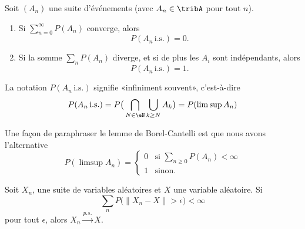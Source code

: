 \begin{lemma}		\label{LEMooXWMXooYEwWBn}
	Soit \( (A_n)\) une suite d'événements (avec \( A_n\in\tribA\) pour tout \( n\)).
	\begin{enumerate}
		\item
		      Si \( \sum_{n=0}^{\infty}P(A_n)\) converge, alors
		      \begin{equation}
			      P(A_n\,\text{i.s.})=0.
		      \end{equation}
		\item
		      Si la somme \( \sum_nP(A_n)\) diverge, et si de plus les \( A_i\) sont indépendants, alors
		      \begin{equation}
			      P(A_n\,\text{i.s.})=1.
		      \end{equation}
	\end{enumerate}
\end{lemma}
La notation \( P(A_n\,\text{i.s.})\) signifie «infiniment souvent», c'est-à-dire
\begin{equation}
	P(A_n\,\text{i.s.})=P\big( \bigcap_{N\in\eN}\bigcup_{k\geq N}A_k \big)=P(\limsup A_n)
\end{equation}

Une façon de paraphraser le lemme de Borel-Cantelli est que nous avons l'alternative
\begin{equation}    \label{EqparaphrCantelli}
	P(\limsup A_n)=\begin{cases}
		0 & \text{si }\sum_{n\geq 0}P(A_n)<\infty \\
		1 & \text{sinon}.
	\end{cases}
\end{equation}

\begin{proposition}
	Soit \( X_n\), une suite de variables aléatoires et \( X\) une variable aléatoire. Si
	\begin{equation}
		\sum_nP\big( \| X_n-X \|>\epsilon \big)<\infty
	\end{equation}
	pour tout \( \epsilon\), alors \( X_n\stackrel{p.s.}{\longrightarrow}X\).
\end{proposition}

